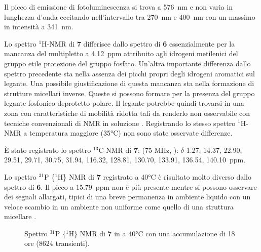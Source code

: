 Il picco di emissione di fotoluminescenza si trova a 576~nm e non varia in lunghezza d'onda eccitando nell'intervallo tra 270~nm e 400~nm con un massimo in intensità a 341~nm.  

Lo spettro $^1$H-NMR di {\bf 7} differisce dallo spettro di {\bf 6} essenzialmente per la mancanza del multipletto a 4.12~ppm attribuito agli idrogeni metilenici del gruppo etile protezione del gruppo fosfato. Un'altra importante differenza dallo spettro precedente sta nella assenza dei picchi propri degli idrogeni aromatici sul legante. Una possibile giustificazione di questa mancanza sta nella formazione di strutture micellari inverse. Queste si possono formare per la presenza del gruppo legante fosfonico deprotetto polare. Il legante potrebbe quindi trovarsi in una zona con caratteristiche di mobilità ridotta tali da renderlo non osservabile con tecniche convenzionali di NMR in soluzione \cite{lig-micelle-nmr2}. Registrando lo stesso spettro $^1$H-NMR a temperatura maggiore (35°C) non sono state osservate differenze. 

È stato registrato lo spettro $^{13}$C-NMR di {\bf 7}: (75 MHz, ): $\delta$ 1.27, 14.37, 22.90, 29.51, 29.71, 30.75, 31.94, 116.32, 128.81, 130.70, 133.91, 136.54, 140.10~ppm. 

Lo spettro $^{31}$P \{$^1$H\} NMR di {\bf 7} registrato a 40°C è risultato molto diverso dallo spettro di {\bf 6}. Il picco a 15.79~ppm non è più presente mentre si possono osservare dei segnali allargati, tipici {
di una breve permanenza in ambiente liquido con un veloce scambio in un ambiente non uniforme come quello di una struttura micellare \cite{lig-micelle-nmr2}.}
\begin{figure}
\caption{\footnotesize{Spettro $^{31}$P \{$^1$H\} NMR di {\bf 7} in  a 40°C con una accumulazione di 18 ore (8624 transienti).}
\label{fig:P3HT-leg-PNMR}}
\end{figure}


